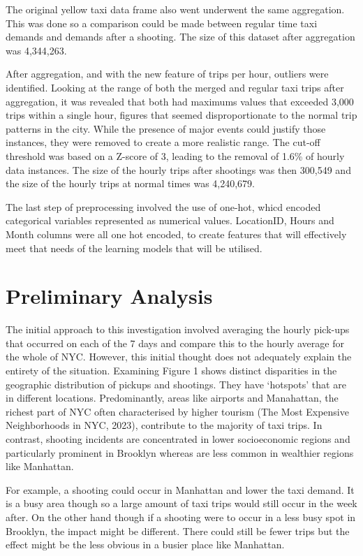 \documentclass[11pt]{article}
\begin{document}
The original yellow taxi data frame also went underwent the same aggregation. This was done so a comparison could be made between regular time taxi demands and demands after a shooting. The size of this dataset after aggregation was 4,344,263.

After aggregation, and with the new feature of trips per hour, outliers were identified. Looking at the range of both the merged and regular taxi trips after aggregation, it was revealed that both had maximums values that exceeded 3,000 trips within a single hour, figures that seemed disproportionate to the normal trip patterns in the city. While the presence of major events could justify those instances, they were removed to create a more realistic range. The cut-off threshold was based on a Z-score of 3, leading to the removal of 1.6\% of hourly data instances.  The size of the hourly trips after shootings was then 300,549 and the size of the hourly trips at normal times was 4,240,679.

The last step of preprocessing involved the use of one-hot, whicd encoded categorical variables represented as numerical values. LocationID, Hours and Month columns were all one hot encoded, to create features that will effectively meet that needs of the learning models that will be utilised.

\section{Preliminary Analysis}
\hspace{0pt}The initial approach to this investigation involved averaging the hourly pick-ups that occurred on each of the 7 days and compare this to the hourly average for the whole of NYC. However, this initial thought does not adequately explain the entirety of the situation. Examining Figure 1 shows distinct disparities in the geographic distribution of pickups and shootings. They have ‘hotspots’ that are in different locations. Predominantly, areas like airports and Manahattan, the richest part of NYC often characterised by higher tourism (The Most Expensive Neighborhoods in NYC, 2023), contribute to the majority of taxi trips. In contrast, shooting incidents are concentrated in lower socioeconomic regions and particularly prominent in Brooklyn whereas are less common in wealthier regions like Manhattan. 

For example, a shooting could occur in Manhattan and lower the taxi demand. It is a busy area though so a large amount of taxi trips would still occur in the week after. On the other hand though if a shooting were to occur in a less busy spot in Brooklyn, the impact might be different. There could still be fewer trips but the effect might be the less obvious in a busier place like Manhattan.
\end{document}
